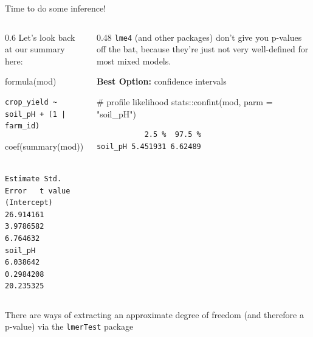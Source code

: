 \documentclass[
  ignorenonframetext,
  aspectratio=169,
]{beamer}
\newenvironment{Shaded}{\begin{snugshade}}{\end{snugshade}}
\newcommand{\AttributeTok}[1]{\textcolor[rgb]{0.40,0.45,0.13}{#1}}
\newcommand{\CommentTok}[1]{\textcolor[rgb]{0.37,0.37,0.37}{#1}}
\newcommand{\FunctionTok}[1]{\textcolor[rgb]{0.28,0.35,0.67}{#1}}
\newcommand{\NormalTok}[1]{\textcolor[rgb]{0.00,0.23,0.31}{#1}}
\newcommand{\SpecialCharTok}[1]{\textcolor[rgb]{0.37,0.37,0.37}{#1}}
\newcommand{\StringTok}[1]{\textcolor[rgb]{0.13,0.47,0.30}{#1}}
\begin{document}
\begin{frame}[fragile]{Time to do some inference!}
\label{time-to-do-some-inference}
\begin{columns}[T]
\begin{column}{0.6\textwidth}
Let's look back at our summary here:

\begin{Shaded}
\begin{Highlighting}[]
\FunctionTok{formula}\NormalTok{(mod)}
\end{Highlighting}
\end{Shaded}

\begin{verbatim}
crop_yield ~ soil_pH + (1 | farm_id)
\end{verbatim}

\pause

\begin{Shaded}
\begin{Highlighting}[]
\FunctionTok{coef}\NormalTok{(}\FunctionTok{summary}\NormalTok{(mod))}
\end{Highlighting}
\end{Shaded}

\begin{verbatim}
             Estimate Std. Error   t value
(Intercept) 26.914161  3.9786582  6.764632
soil_pH      6.038642  0.2984208 20.235325
\end{verbatim}
\end{column}

\pause

\begin{column}{0.48\textwidth}
\texttt{lme4} (and other packages) don't give you p-values off the bat,
because they're just not very well-defined for most mixed models.
\vspace{1.5em}

\pause

\textbf{Best Option:} confidence intervals

\small

\begin{Shaded}
\begin{Highlighting}[]
\CommentTok{\# profile likelihood}
\NormalTok{stats}\SpecialCharTok{::}\FunctionTok{confint}\NormalTok{(mod, }\AttributeTok{parm =} \StringTok{"soil\_pH"}\NormalTok{)}
\end{Highlighting}
\end{Shaded}

\begin{verbatim}
           2.5 %  97.5 %
soil_pH 5.451931 6.62489
\end{verbatim}
\end{column}
\end{columns}

\center

There are ways of extracting an approximate degree of freedom (and
therefore a p-value) via the \texttt{lmerTest} package
\end{frame}
\end{document}
